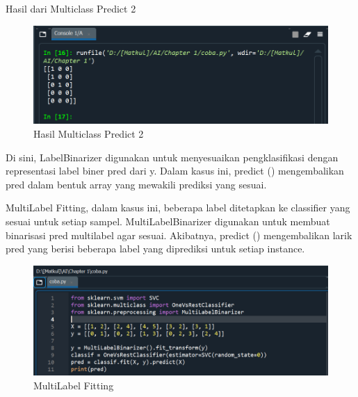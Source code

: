 \par Hasil dari Multiclass Predict 2

    \begin{figure}[H]
    \centering
    \includegraphics[width=13cm]{figures/1184023/29.PNG}
    \caption{Hasil Multiclass Predict 2}
    \end{figure}

\par Di sini, LabelBinarizer digunakan untuk menyesuaikan pengklasifikasi dengan representasi label biner pred dari y. Dalam kasus ini, predict () mengembalikan pred dalam bentuk array yang mewakili prediksi yang sesuai.

\par MultiLabel Fitting, dalam kasus ini, beberapa label ditetapkan ke classifier yang sesuai untuk setiap sampel. MultiLabelBinarizer digunakan untuk membuat binarisasi pred multilabel agar sesuai. Akibatnya, predict () mengembalikan larik pred yang berisi beberapa label yang diprediksi untuk setiap instance.

    \begin{figure}[H]
    \centering
    \includegraphics[width=13cm]{figures/1184023/30.PNG}
    \caption{MultiLabel Fitting}
    \end{figure}

